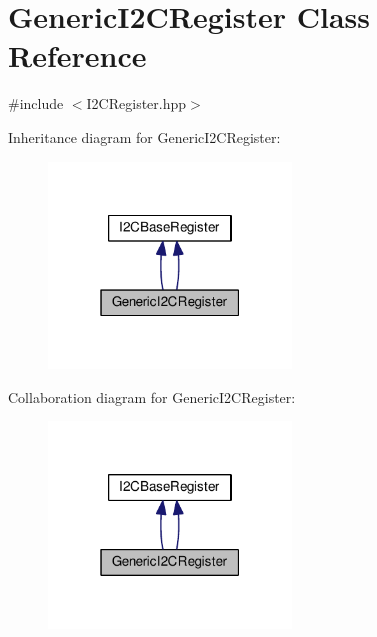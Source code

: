 \hypertarget{class_generic_i2_c_register}{}\section{Generic\+I2\+C\+Register Class Reference}
\label{class_generic_i2_c_register}


{\ttfamily \#include $<$I2\+C\+Register.\+hpp$>$}



Inheritance diagram for Generic\+I2\+C\+Register\+:\nopagebreak
\begin{figure}[H]
\begin{center}
\leavevmode
\includegraphics[width=183pt]{class_generic_i2_c_register__inherit__graph}
\end{center}
\end{figure}


Collaboration diagram for Generic\+I2\+C\+Register\+:\nopagebreak
\begin{figure}[H]
\begin{center}
\leavevmode
\includegraphics[width=183pt]{class_generic_i2_c_register__coll__graph}
\end{center}
\end{figure}
